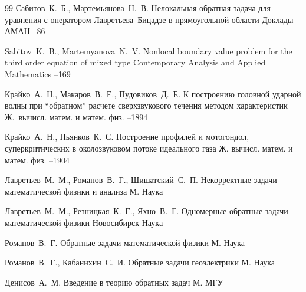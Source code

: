 \begin{thebibliography}{99}
\by Сабитов~К.~Б., Мартемьянова~Н.~В. 
\paper Нелокальная обратная задача для уравнения с оператором Лавретьева--Бицадзе в прямоугольной области 
\jour Доклады АМАН
–86

\by  Sabitov~K.~B., Martemyanova~N.~V.
 \paper Nonlocal boundary value problem for the third order equation of mixed type 
 \jour Contemporary Analysis and Applied Mathematics
–169

\by Крайко~А.~Н., Макаров~В.~Е., Пудовиков~Д.~Е.
\paper К построению головной ударной волны при ``обратном'' расчете сверхзвукового течения методом характеристик
\jour Ж.~вычисл. матем. и матем. физ.
--1894

\by Крайко~А.~Н., Пьянков~К.~С. 
\paper Построение профилей и мотогондол, суперкритических в околозвуковом потоке идеального газа
\jour Ж. вычисл. матем. и матем. физ.
--1904

\by Лавретьев~М.~М., Романов~В.~Г., Шишатский~С.~П.
\book Некорректные задачи математической физики и анализа
\publaddr М.
\publ Наука

\by Лавретьев~М.~М., Резницкая~К.~Г., Яхно~В.~Г.
\book Одномерные обратные задачи математической физики
\publaddr Новосибирск
\publ Наука

\by Романов~В.~Г.
\book Обратные задачи математической физики
\publaddr М.
\publ Наука

\by Романов~В.~Г., Кабанихин~С.~И.
\book Обратные задачи геоэлектрики
\publaddr М.
\publ Наука


\by  Денисов~А.~М.
\book Введение в теорию обратных задач
\publaddr М.
\publ МГУ


\end{thebibliography}
